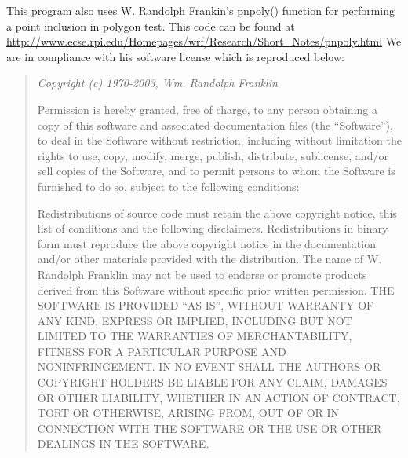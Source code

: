 This program also uses W. Randolph Frankin's pnpoly() 
function for performing a point inclusion in polygon test. 
This code can be found at
\url{http://www.ecse.rpi.edu/Homepages/wrf/Research/Short\_Notes/pnpoly.html}
We are in compliance with his software license which is 
reproduced below\cite{Franklin05}:
\begin{quotation}\em
Copyright (c) 1970-2003, Wm. Randolph Franklin

Permission is hereby granted, free of charge, to any person obtaining 
a copy of this software and associated documentation files (the 
``Software''), to deal in the Software without restriction, including 
without limitation the rights to use, copy, modify, merge, publish, 
distribute, sublicense, and/or sell copies of the Software, and to 
permit persons to whom the Software is furnished to do so, subject 
to the following conditions:

Redistributions of source code must retain the above copyright 
notice, this list of conditions and the following disclaimers.
Redistributions in binary form must reproduce the above copyright 
notice in the documentation and/or other materials provided with 
the distribution.
The name of W. Randolph Franklin may not be used to endorse or 
promote products derived from this Software without specific 
prior written permission.
THE SOFTWARE IS PROVIDED ``AS IS'', WITHOUT WARRANTY OF ANY KIND, 
EXPRESS OR IMPLIED, INCLUDING BUT NOT LIMITED TO THE WARRANTIES OF 
MERCHANTABILITY, FITNESS FOR A PARTICULAR PURPOSE AND 
NONINFRINGEMENT. IN NO EVENT SHALL THE AUTHORS OR COPYRIGHT HOLDERS 
BE LIABLE FOR ANY CLAIM, DAMAGES OR OTHER LIABILITY, WHETHER IN AN 
ACTION OF CONTRACT, TORT OR OTHERWISE, ARISING FROM, OUT OF OR IN 
CONNECTION WITH THE SOFTWARE OR THE USE OR OTHER DEALINGS IN THE 
SOFTWARE.
\end{quotation}

